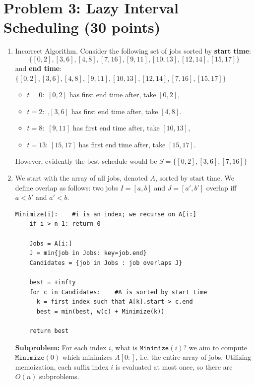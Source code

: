 \documentclass[12pt]{article}
\newcounter{subproblem}
\begin{document}
\section*{Problem 3: Lazy Interval Scheduling (30 points)}
\begin{enumerate}
\item[(a)] Incorrect Algorithm. Consider the following set of jobs sorted by \textbf{start time}:
\[ \{[0,2], [3,6], [4,8], [7,16], [9,11], [10,13], [12,14], [15,17]\} \]
and \textbf{end time}: $\{[0,2], [3,6], [4,8], [9,11], [10,13], [12,14], [7,16], [15,17]\}$

\begin{itemize}
    \item $t = 0:$ $[0,2]$ has first end time after, take $[0,2]$,
    \item $t = 2:$ ,$[3,6]$ has first end time after, take $[4, 8]$.
    \item $t = 8:$ $[9, 11]$ has first end time after, take $[10, 13]$,
    \item $t = 13$: $[15, 17]$ has first end time after, take $[15, 17]$.
\end{itemize}
    
However, evidently the best schedule would be $S = \{[0,2], [3, 6], [7,16]\}$

\item[(b)] We start with the array of all jobs, denoted $A$, sorted by start time.
We define overlap as follows: two jobs $I=[a,b]$ and $J=[a',b']$ overlap iff $a<b'$ and $a'<b$.

\begin{algorithm}[H]
\begin{lstlisting}
Minimize(i):    #i is an index; we recurse on A[i:]
    if i > n-1: return 0

    Jobs = A[i:]
    J = min{job in Jobs: key=job.end}
    Candidates = {job in Jobs : job overlaps J}
    
    best = +infty
    for c in Candidates:    #A is sorted by start time
      k = first index such that A[k].start > c.end
      best = min(best, w(c) + Minimize(k))
    
    return best
\end{lstlisting}
\end{algorithm}

\textbf{Subproblem:} For each index $i$, what is $\texttt{Minimize}(i)$? we aim to compute $\texttt{Minimize}(0)$ which minimizes $A[0:]$, i.e. the entire array of jobs. Utilizing memoization, each suffix index $i$ is evaluated at most once, so there are $O(n)$ subproblems. 


\end{enumerate}
\end{document}
